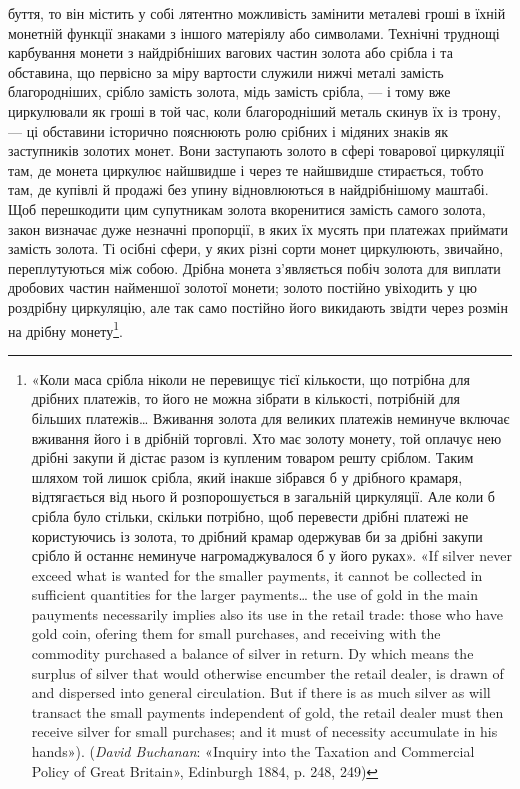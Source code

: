 \parcont{}  %
буття, то він містить у собі лятентно можливість замінити металеві
гроші в їхній монетній функції знаками з іншого матеріялу або
символами. Технічні труднощі карбування монети з найдрібніших
вагових частин золота або срібла і та обставина, що первісно
за міру вартости служили нижчі металі замість благородніших,
срібло замість золота, мідь замість срібла, — і тому вже циркулювали
як гроші в той час, коли благородніший металь скинув
їх із трону, — ці обставини історично пояснюють ролю срібних
і мідяних знаків як заступників золотих монет. Вони заступають
золото в сфері товарової циркуляції там, де монета циркулює
найшвидше і через те найшвидше стирається, тобто там, де купівлі
й продажі без упину відновлюються в найдрібнішому
маштабі. Щоб перешкодити цим супутникам золота вкоренитися
замість самого золота, закон визначає дуже незначні пропорції,
в яких їх мусять при платежах приймати замість золота. Ті осібні
сфери, у яких різні сорти монет циркулюють, звичайно, переплутуються
між собою. Дрібна монета з’являється побіч золота
для виплати дробових частин найменшої золотої монети; золото
постійно увіходить у цю роздрібну циркуляцію, але так само
постійно його викидають звідти через розмін на дрібну монету\footnote{
«Коли маса срібла ніколи не перевищує тієї кількости, що потрібна
для дрібних платежів, то його не можна зібрати в кількості, потрібній
для більших платежів\dots{} Вживання золота для великих платежів неминуче
включає вживання його і в дрібній торговлі. Хто має золоту монету, той
оплачує нею дрібні закупи й дістає разом із купленим товаром решту
сріблом. Таким шляхом той лишок срібла, який інакше зібрався б у дрібного
крамаря, відтягається від нього й розпорошується в загальній циркуляції.
Але коли б срібла було стільки, скільки потрібно, щоб перевести
дрібні платежі не користуючись із золота, то дрібний крамар одержував
би за дрібні закупи срібло й останнє неминуче нагромаджувалося б у
його руках». «If silver never exceed what is wanted for the smaller payments,
it cannot be collected in sufficient quantities for the larger payments\dots{}
the use of gold in the main pauyments necessarily implies also
its use in the retail trade: those who have gold coin, ofering them for small
purchases, and receiving with the commodity purchased a balance of silver
in return. Dy which means the surplus of silver that would otherwise encumber
the retail dealer, is drawn of and dispersed into general circulation.
But if there is as much silver as will transact the small payments independent
of gold, the retail dealer must then receive silver for small purchases; and
it must of necessity accumulate in his hands»). (\emph{David Buchanan}: «Inquiry
into the Taxation and Commercial Policy of Great Britain», Edinburgh
1884, p. 248, 249)
}.


